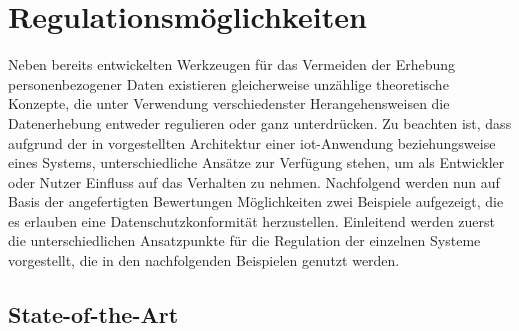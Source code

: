 \section{Regulationsmöglichkeiten}
\label{sec:Regulationsmöglichkeiten}

Neben bereits entwickelten Werkzeugen für das Vermeiden der Erhebung personenbezogener Daten existieren gleicherweise unzählige theoretische Konzepte, die unter Verwendung verschiedenster Herangehensweisen die Datenerhebung entweder regulieren oder ganz unterdrücken. 
Zu beachten ist, dass aufgrund der in  vorgestellten Architektur einer \ac{iot}-Anwendung beziehungsweise eines Systems, unterschiedliche Ansätze zur Verfügung stehen, um als Entwickler oder Nutzer Einfluss auf das Verhalten zu nehmen. Nachfolgend werden nun auf Basis der angefertigten Bewertungen Möglichkeiten zwei Beispiele aufgezeigt, die es erlauben eine Datenschutzkonformität herzustellen.
Einleitend werden zuerst die unterschiedlichen Ansatzpunkte für die Regulation der einzelnen Systeme vorgestellt, die in den nachfolgenden Beispielen genutzt werden.

\subsection{State-of-the-Art}
\label{sec:Regulationsmöglichkeiten:ssec:State-of-the-Art}

